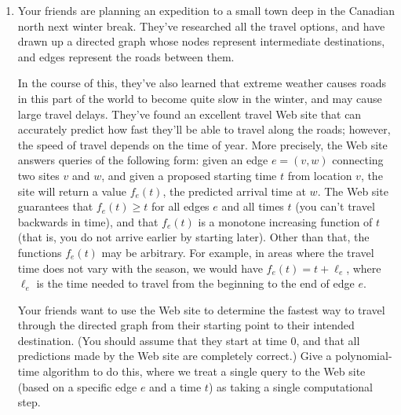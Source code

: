 \documentclass[12pt]{article}
\begin{document}
\begin{enumerate}
{}


\item 

Your friends are planning an expedition to a small town
deep in the Canadian north next winter break.
They've researched all the travel options, and have
drawn up a directed graph whose nodes represent intermediate
destinations, and edges represent the roads between them.

In the course of this, they've also learned that extreme weather
causes roads in this part
of the world to become quite slow in the winter,
and may cause large travel delays.
They've found an excellent travel Web site that can accurately
predict how fast they'll be able to travel along the roads;
however, the speed of travel depends on the time of year.
More precisely, the Web site answers queries of the following form:
given an edge $e = (v,w)$ connecting two sites $v$ and $w$,
and given a proposed starting time $t$ from location $v$,
the site will return a value $f_e(t)$, the predicted arrival time at $w$.
The Web site guarantees that $f_e(t) \ge t$ for all edges $e$ and all
times $t$ (you can't travel backwards in time), and that
$f_e(t)$ is a monotone increasing function of $t$
(that is, you do not arrive earlier by starting later).
Other than that, the functions $f_e(t)$ may be arbitrary.
For example, in areas where the travel time does not vary with the
season, we would have $f_e(t)=t+\ell_e$, where $\ell_e$ is the time needed
to travel from the beginning to the end of edge $e$.

Your friends want to use the Web site to determine the fastest
way to travel through the directed graph
from their starting point to their intended destination.
(You should assume that they start at time $0$, and that all
predictions made by the Web site are completely correct.)
Give a polynomial-time algorithm to do this, where we treat
a single query to the Web site (based on a specific edge $e$ and a time $t$)
as taking a single computational step.

\end{enumerate}
\end{document}

